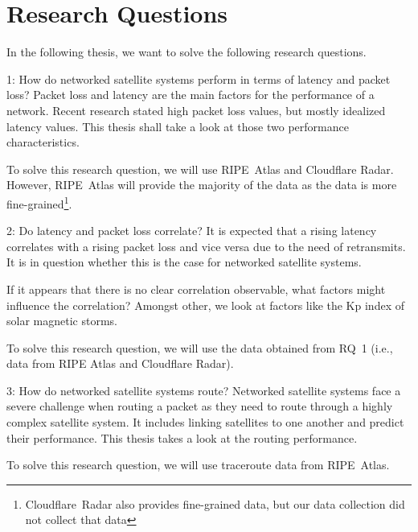 \section{Research Questions} \label{sec:research-questions}

In the following thesis, we want to solve the following research questions.

\begin{rqbox}{1: How do networked satellite systems perform in terms of latency
		and packet loss?}
	Packet loss and latency are the main factors for the performance of a
	network. Recent research stated high packet loss values, but mostly
	idealized latency values. This thesis shall take a look at those two
	performance characteristics.

	To solve this research question, we will use RIPE~Atlas and Cloudflare
	Radar. However, RIPE~Atlas will provide the majority of the data as the
	data is more fine-grained\footnote{Cloudflare~Radar also provides
		fine-grained data, but our data collection did not collect that
		data}.
\end{rqbox}

\begin{rqbox}{2: Do latency and packet loss correlate?}
	It is expected that a rising latency correlates with a rising packet
	loss and vice versa due to the need of retransmits.
	It is in question whether this is the case for networked satellite
	systems.

	If it appears that there is no clear correlation observable, what
	factors might influence the correlation? Amongst other, we look at
	factors like the Kp index of solar magnetic storms.

	To solve this research question, we will use the data obtained from
	RQ~1 (i.e., data from RIPE Atlas and Cloudflare Radar).
\end{rqbox}

\begin{rqbox}{3: How do networked satellite systems route?}
	Networked satellite systems face a severe challenge when routing a
	packet as they need to route through a highly complex satellite system.
	It includes linking satellites to one another and predict their
	performance. This thesis takes a look at the routing performance.

	To solve this research question, we will use traceroute data from
	RIPE~Atlas.
\end{rqbox}
